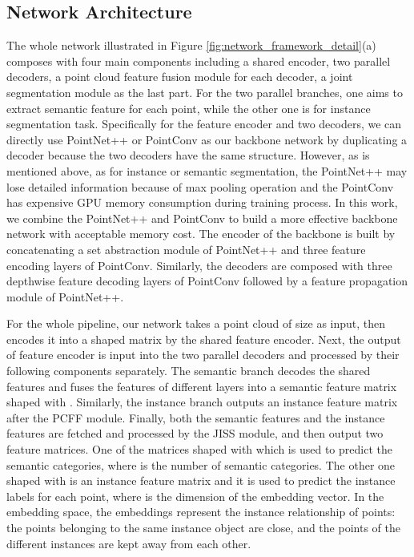 \documentclass[letterpaper]{article} \usepackage{aaai20}  \usepackage{times}  \usepackage{helvet} \usepackage{courier}  \usepackage[hyphens]{url}  \usepackage{graphicx} \urlstyle{rm} \def\UrlFont{\rm}  \usepackage{graphicx}  \frenchspacing  \setlength{\pdfpagewidth}{8.5in}  \setlength{\pdfpageheight}{11in}
\begin{document}
\subsection{Network Architecture}
The whole network illustrated in Figure \ref{fig:network_framework_detail}(a) composes with four main components including a shared encoder, two parallel decoders, a point cloud feature fusion module for each decoder, a joint segmentation module as the last part. For the two parallel branches, one aims to extract semantic feature for each point, while the other one is for instance segmentation task. Specifically for the feature encoder and two decoders, we can directly use PointNet++ or PointConv as our backbone network by duplicating a decoder because the two decoders have the same structure. However, as is mentioned above, as for instance or semantic segmentation, the PointNet++ may lose detailed information because of max pooling operation and the PointConv has expensive GPU memory consumption during training process. In this work, we combine the PointNet++ and PointConv to build a more effective backbone network with acceptable memory cost. The encoder of the backbone is built by concatenating a set abstraction module of PointNet++ and three feature encoding layers of PointConv. Similarly, the decoders are composed with three depthwise feature decoding layers of PointConv followed by a feature propagation module of PointNet++.

For the whole pipeline, our network takes a point cloud of size  as input, then encodes it into a  shaped matrix by the shared feature encoder. Next, the output of feature encoder is input into the two parallel decoders and processed by their following components separately. The semantic branch decodes the shared features and fuses the features of different layers into a semantic feature matrix  shaped with . Similarly,  the instance branch outputs an instance feature matrix  after the PCFF module. Finally, both the semantic features and the instance features are fetched and processed  by the JISS module, and then output two feature matrices. One of the matrices  shaped with  which is used to predict the semantic categories, where  is the number of semantic categories. The other one  shaped with  is an instance feature matrix and it is used to predict the instance labels for each point, where  is the dimension of the embedding vector. In the embedding space, the embeddings represent the instance relationship of points: the points belonging to the same instance object are close, and the points of the different instances are kept away from each other.
\end{document}
